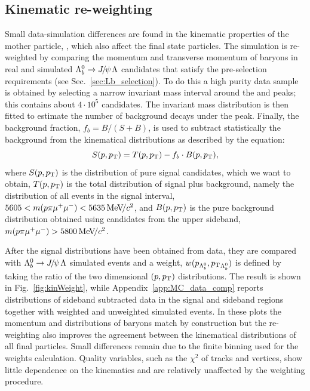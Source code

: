 \subsection{Kinematic re-weighting}
\label{sec:kinWeight}

Small data-simulation differences are found in the kinematic properties of the mother particle, \Lb,
which also affect the final state particles. The simulation is re-weighted by 
comparing the momentum and transverse momentum of \Lb baryons in 
real and simulated $\Lb\to\jpsi\Lz$ candidates that satisfy the pre-selection requirements (see Sec.~\ref{sec:Lb_selection}).
To do this a high purity data sample is obtained by selecting a narrow invariant mass interval around the \jpsi 
and \Lb peaks; this contains about $4\cdot10^5$ candidates.
The \Lb invariant mass distribution is then fitted to estimate the number of background decays under the peak.
Finally, the background fraction, \mbox{$f_b = B/(S+B)$}, is used to subtract statistically
the background from the kinematical distributions as described by the equation:
%
\begin{equation}
S(p,\mbox{$p_{\rm T}$}) = T(p,\mbox{$p_{\rm T}$}) - f_b\cdot B(p,\mbox{$p_{\rm T}$}),
\end{equation}
\noindent
where $S(p,\mbox{$p_{\rm T}$})$ is the distribution of pure signal candidates, which we want to obtain, $T(p,\mbox{$p_{\rm T}$})$ is the total
distribution of signal plus background, namely the distribution of all events in the signal interval,
$5605 < m(p\pi\mumu) < 5635 \mevcc$, and $B(p,\mbox{$p_{\rm T}$})$ is the pure background
distribution obtained using candidates from the upper sideband, $m(p\pi\mumu) > 5800 \mevcc$.

After the signal distributions have been obtained from data, they are compared with \mbox{$\Lb\to\jpsi\Lz$} simulated events
and a weight, $w(p_{{{\Lambda}^0_{b}}},\mbox{$p_{\rm T}$}_{{{\Lambda}^0_{b}}})$ is defined by taking the ratio of the two dimensional $(p,\mbox{$p_{\rm T}$})$ distributions.
The result is shown in Fig.~\ref{fig:kinWeight}, while Appendix~\ref{app:MC_data_comp} reports distributions
of sideband subtracted data in the signal and sideband regions together with weighted and unweighted simulated events.
In these plots the momentum and \pt distributions of \Lb baryons match by construction but the re-weighting also improves the agreement 
between the kinematical distributions of all final particles. Small differences remain due to
the finite binning used for the weights calculation. Quality variables, such as the $\chi^2$ of tracks
and vertices, show little dependence on the kinematics and are relatively unaffected by the weighting procedure.

